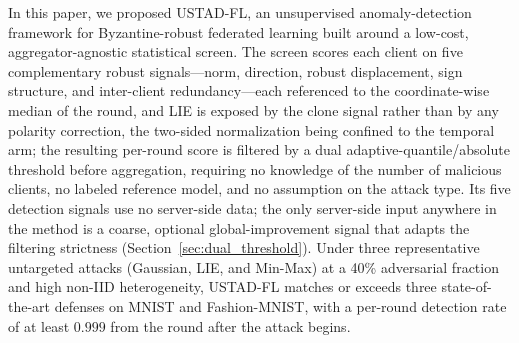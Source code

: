 \documentclass[journal]{IEEEtran}
\begin{document}
In this paper, we proposed USTAD-FL, an unsupervised anomaly-detection framework for Byzantine-robust federated learning built around a low-cost, aggregator-agnostic statistical screen. The screen scores each client on five complementary robust signals---norm, direction, robust displacement, sign structure, and inter-client redundancy---each referenced to the coordinate-wise median of the round, and LIE is exposed by the clone signal rather than by any polarity correction, the two-sided normalization being confined to the temporal arm; the resulting per-round score is filtered by a dual adaptive-quantile/absolute threshold before aggregation, requiring no knowledge of the number of malicious clients, no labeled reference model, and no assumption on the attack type. Its five detection signals use no server-side data; the only server-side input anywhere in the method is a coarse, optional global-improvement signal that adapts the filtering strictness (Section~\ref{sec:dual_threshold}). Under three representative untargeted attacks (Gaussian, LIE, and Min-Max) at a 40\% adversarial fraction and high non-IID heterogeneity, USTAD-FL matches or exceeds three state-of-the-art defenses on MNIST and Fashion-MNIST, with a per-round detection rate of at least $0.999$ from the round after the attack begins.
\end{document}
